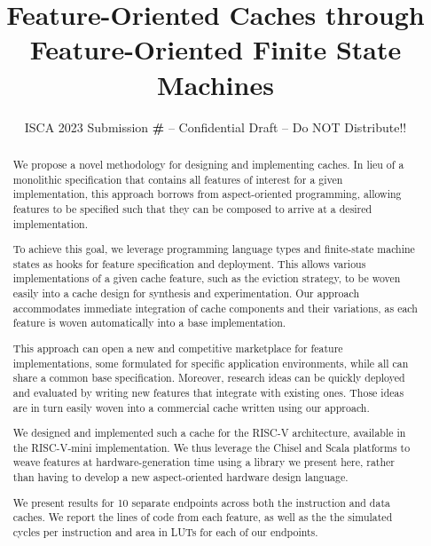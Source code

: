 \documentclass[conference]{IEEEtran}
\title{Feature-Oriented Caches through Feature-Oriented Finite State Machines}
\author{\normalsize{ISCA 2023 Submission
    \textbf{\#\iscasubmissionnumber} -- Confidential Draft -- Do NOT Distribute!!}}
\begin{document}
\maketitle
\thispagestyle{plain}
\pagestyle{plain}



\def\Riscv{\mbox{RISC-V}}
\def\Riscvmini{\mbox{\Riscv{}-mini}}
\def\Rocketchip{\mbox{Rocket Chip}}

\begin{abstract}
We propose a novel methodology for designing and implementing caches.  In lieu of a monolithic specification that contains all features of interest for a given implementation, this approach borrows from aspect-oriented programming, allowing features to be specified such that they can be composed to arrive at a desired implementation.

To achieve this goal, we leverage programming language types and finite-state machine states as hooks for feature specification and deployment.  This allows various implementations of a given cache feature, such as the eviction strategy, to be woven easily into a cache design for synthesis and experimentation.  Our approach accommodates immediate integration of cache components and their variations, as each feature is woven automatically into a base implementation.

This approach can open a new and competitive marketplace for feature implementations, some formulated for specific application environments, while all can share a common base specification.  Moreover, research ideas can be quickly deployed and evaluated by writing new features that integrate with existing ones.  Those ideas are in turn easily woven into a commercial cache written using our approach. 

We designed and implemented such a cache for the \Riscv{} architecture, available in the \Riscvmini{} implementation.  We thus leverage the
Chisel and Scala platforms to weave features at hardware-generation time using a library we present here, rather than having to develop a new aspect-oriented hardware design language.

We present results for 10 separate endpoints across both the instruction and data caches. We report the lines of code from each feature, as well as the the simulated cycles per instruction and area in LUTs for each of our endpoints.

\end{abstract}
\end{document}
